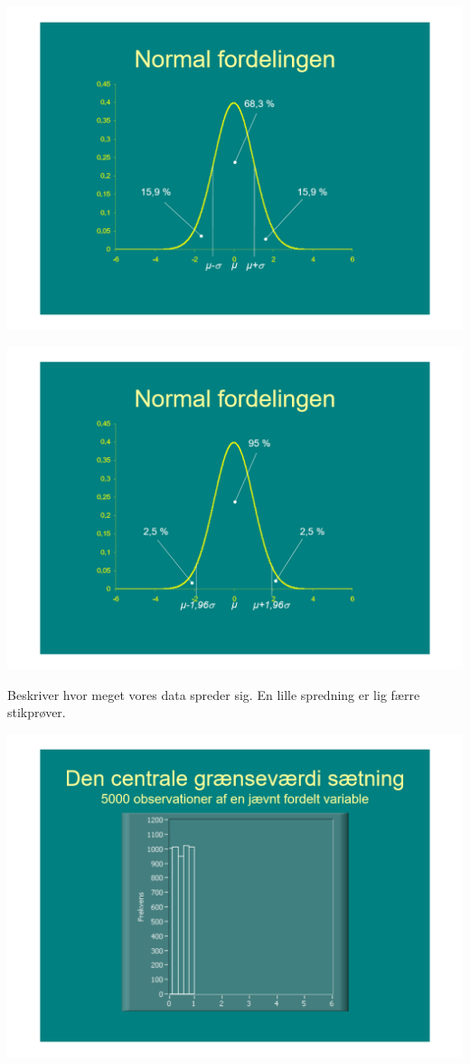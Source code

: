 \documentclass[12pt, letterpaper]{article}
\begin{document}
\begin{center}
\includegraphics[width=\textwidth]{billeder/billede23}
\end{center}

\begin{center}
\includegraphics[width=\textwidth]{billeder/billede24}
\end{center}
Beskriver hvor meget vores data spreder sig. En lille spredning er lig færre stikprøver.

\begin{center}
\includegraphics[width=\textwidth]{billeder/billede25}
\end{center}
\end{document}

